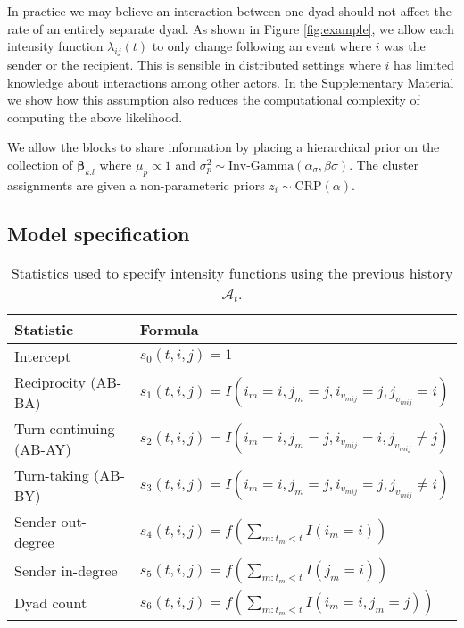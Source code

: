  In practice we may believe an interaction between one dyad should not affect the rate of an entirely separate dyad.
As shown in Figure \ref{fig:example}, we allow each intensity function $\lambda_{ij}(t)$ to only change following an event where $i$ was the sender or the recipient.
This is sensible in distributed settings where $i$ has limited knowledge about interactions among other actors.
In the Supplementary Material we show how this assumption also reduces the computational complexity of computing the above likelihood.

We allow the blocks to share information by placing a hierarchical prior on the collection of $\boldsymbol{\beta}_{k.l}$ where $\mu_p \propto 1$ and $\sigma_p^2 \sim \mbox{Inv-Gamma}(\alpha_{\sigma},\beta{\sigma})$.
The cluster assignments are given a non-parameteric priors $z_i \sim \mbox{CRP}(\alpha)$.

\subsection{Model specification}

\begin{table}[t]
\footnotesize
\center
\begin{tabular}{|l|l|}
\hline
Statistic & Formula \\
\hline
\hline
Intercept& $s_{0}(t,i,j) = 1$\\
Reciprocity (AB-BA)& $s_{1}(t,i,j) = I(i_m=i,j_m=j,i_{v_{mij}}=j,j_{v_{mij}}=i)$\\
Turn-continuing (AB-AY)& $s_{2}(t,i,j) =  I(i_m=i,j_m=j,i_{v_{mij}}=i,j_{v_{mij}}\ne j)$\\
Turn-taking (AB-BY)&$s_{3}(t,i,j) = I(i_m=i,j_m=j,i_{v_{mij}}=j,j_{v_{mij}}\ne i)$\\
Sender out-degree& $s_{4}(t,i,j) = f(\sum_{m:t_m<t} I(i_m=i) )$\\
Sender in-degree& $s_{5}(t,i,j) = f(\sum_{m:t_m<t} I(j_m=i) )$\\
Dyad count& $s_{6}(t,i,j) = f(\sum_{m:t_m<t} I(i_m=i,j_m=j) )$\\
\hline
\end{tabular}
\label{tab:stats}
\caption{Statistics used to specify intensity functions using the previous history $\mathcal{A}_t$.}
\end{table}



